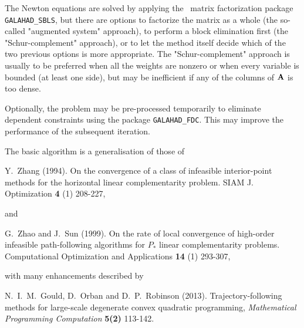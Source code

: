 \documentclass{galahad}
\begin{document}
The Newton equations are solved  by applying the
\galahad\ matrix factorization package
{\tt GALAHAD\_SBLS}, but there are options
to factorize the matrix as a whole (the so-called "augmented system"
approach), to perform a block elimination first (the "Schur-complement"
approach), or to let the method itself decide which of the two
previous options is more appropriate.
The "Schur-complement" approach is usually to be preferred when all the
weights are nonzero or when every variable is bounded (at least one side),
but may be inefficient if any of the columns of ${\mathbf{A}}$ is too dense.

Optionally, the problem may be pre-processed temporarily to eliminate dependent
constraints using the package {\tt GALAHAD\_FDC}. This may improve the
performance of the subsequent iteration.

\vspace*{1mm}

\galreferences
\vspace*{1mm}

\noindent
The basic algorithm is a generalisation of those of
\vspace*{1mm}

\noindent
Y.\ Zhang (1994).
On the convergence of a class of infeasible interior-point methods for the
horizontal linear complementarity problem.
SIAM J. Optimization {\bf 4} (1) 208-227,
\vspace*{1mm}

\noindent
and

\noindent
G.\ Zhao and J.\ Sun (1999).
On the rate of local convergence of high-order
infeasible path-following algorithms for $P_*$ linear complementarity
problems.
Computational Optimization and Applications {\bf 14} (1) 293-307,
\vspace*{1mm}

\noindent
with many enhancements described by
\vspace*{1mm}

\noindent
N.\ I.\ M.\ Gould, D.\ Orban and D.\ P.\ Robinson (2013).
Trajectory-following methods for
large-scale  degenerate convex quadratic programming,
{\em Mathematical Programming Computation} {\bf 5(2)}
113-142.

\end{document}
